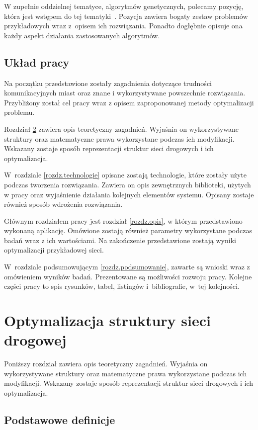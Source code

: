 \documentclass[twoside,12pt]{report}
\let\oldsection\chapter
\def\chapter{\cleardoublepage\oldsection}
\begin{document}
W zupełnie oddzielnej tematyce, algorytmów genetycznych, polecamy pozycję, która jest wstępem do tej tematyki~\cite{gene}. Pozycja zawiera bogaty zestaw problemów przykładowych wraz z~opisem ich rozwiązania. Ponadto dogłębnie opisuje ona każdy aspekt działania zastosowanych algorytmów. 

\section{Układ pracy}
Na początku przedstawione zostały zagadnienia dotyczące trudności komunikacyjnych miast oraz znane i wykorzystywane powszechnie rozwiązania. Przybliżony został cel pracy wraz z opisem zaproponowanej metody optymalizacji problemu. 

Rozdział \ref{rozdz.optymalizacja} zawiera opis teoretyczny zagadnień. Wyjaśnia on wykorzystywane struktury oraz matematyczne prawa wykorzystane podczas ich modyfikacji. Wskazany zostaje sposób reprezentacji struktur sieci drogowych i ich optymalizacja.

W~rozdziale \ref{rozdz.technologie} opisane zostają technologie, które zostały użyte podczas tworzenia rozwiązania. Zawiera on opis zewnętrznych biblioteki, użytych w pracy oraz wyjaśnienie działania kolejnych elementów systemu. Opisany zostaje również sposób wdrożenia rozwiązania.

Głównym rozdziałem pracy jest rozdział \ref{rozdz.opis},
w którym przedstawiono wykonaną aplikację. Omówione zostają również parametry wykorzystane podczas badań wraz z ich wartościami. Na zakończenie przedstawione zostają wyniki optymalizacji przykładowej sieci.

W~rozdziale podsumowującym \ref{rozdz.podsumowanie}, zawarte są wnioski wraz z omówieniem wyników badań. Prezentowane są możliwości rozwoju pracy. Kolejne części pracy to spis rysunków, tabel, listingów i~bibliografie, w~tej kolejności.

\chapter{Optymalizacja struktury sieci drogowej}\label{rozdz.optymalizacja} 

Poniższy rozdział zawiera opis teoretyczny zagadnień. Wyjaśnia on wykorzystywane struktury oraz matematyczne prawa wykorzystane podczas ich modyfikacji. Wskazany zostaje sposób reprezentacji struktur sieci drogowych i ich optymalizacja.

\section{Podstawowe definicje}
\end{document}
